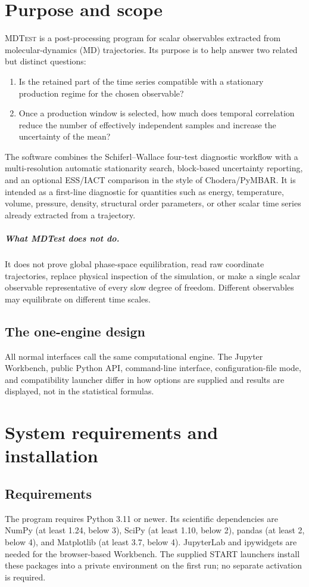 \documentclass[11pt,oneside]{report}
\newcommand{\MDTest}{\textsc{MDTest}}
\begin{document}
\chapter{Purpose and scope}
\MDTest{} is a post-processing program for scalar observables extracted from molecular-dynamics (MD) trajectories. Its purpose is to help answer two related but distinct questions:
\begin{enumerate}
\item Is the retained part of the time series compatible with a stationary production regime for the chosen observable?
\item Once a production window is selected, how much does temporal correlation reduce the number of effectively independent samples and increase the uncertainty of the mean?
\end{enumerate}
The software combines the Schiferl--Wallace four-test diagnostic workflow with a multi-resolution automatic stationarity search, block-based uncertainty reporting, and an optional ESS/IACT comparison in the style of Chodera/PyMBAR. It is intended as a first-line diagnostic for quantities such as energy, temperature, volume, pressure, density, structural order parameters, or other scalar time series already extracted from a trajectory.

\paragraph{What MDTest does not do.} It does not prove global phase-space equilibration, read raw coordinate trajectories, replace physical inspection of the simulation, or make a single scalar observable representative of every slow degree of freedom. Different observables may equilibrate on different time scales.

\section*{The one-engine design}
All normal interfaces call the same computational engine. The Jupyter Workbench, public Python API, command-line interface, configuration-file mode, and compatibility launcher differ in how options are supplied and results are displayed, not in the statistical formulas.

\chapter{System requirements and installation}
\section{Requirements}
The program requires Python 3.11 or newer. Its scientific dependencies are NumPy (at least 1.24, below 3), SciPy (at least 1.10, below 2), pandas (at least 2, below 4), and Matplotlib (at least 3.7, below 4). JupyterLab and ipywidgets are needed for the browser-based Workbench. The supplied START launchers install these packages into a private environment on the first run; no separate activation is required.
\end{document}
